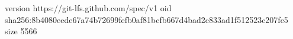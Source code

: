 version https://git-lfs.github.com/spec/v1
oid sha256:8b4080eede67a74b72699fefb0af81bcfb667d4bad2c833ad1f512523c207fe5
size 5566
